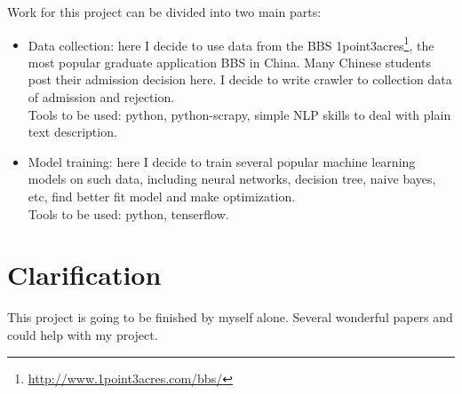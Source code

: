 \documentclass{article}
\begin{document}
Work for this project can be divided into two main parts:

\begin{itemize}
    \item Data collection: here I decide to use data from the BBS 1point3acres\footnote{\url{http://www.1point3acres.com/bbs/}}, the most popular graduate application BBS in China. Many Chinese students post their admission decision here. I decide to write crawler to collection data of admission and rejection.\\
    Tools to be used: python, python-scrapy, simple NLP skills to deal with plain text description.
    \item Model training: here I decide to train several popular machine learning models on such data, including neural networks, decision tree, naive bayes, etc, find better fit model and make optimization.\\
    Tools to be used: python, tenserflow.
\end{itemize}

\section{Clarification}

This project is going to be finished by myself alone. Several wonderful papers \cite{gupta2016will} and \cite{keeley1972bayesian} could help with my project.



\end{document}
